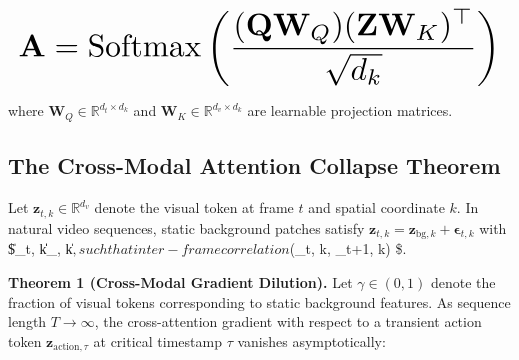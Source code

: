 \documentclass{article}
\begin{document}
\begin{equation}
\resizebox{\columnwidth}{!}{$\displaystyle
\begin{aligned}
\mathbf{A} = \text{Softmax}\left( \frac{(\mathbf{Q} \mathbf{W}_Q) (\mathbf{Z} \mathbf{W}_K)^\top}{\sqrt{d_k}} \right)
\end{aligned}
$}
\end{equation}

























where $\mathbf{W}_Q \in \mathbb{R}^{d_t \times d_k}$ and $\mathbf{W}_K \in \mathbb{R}^{d_v \times d_k}$ are learnable projection matrices.




\subsection{The Cross-Modal Attention Collapse Theorem}


Let $\mathbf{z}_{t, k} \in \mathbb{R}^{d_v}$ denote the visual token at frame $t$ and spatial coordinate $k$. In natural video sequences, static background patches satisfy $\mathbf{z}_{t, k} = \mathbf{z}_{\text{bg}, k} + \boldsymbol{\epsilon}_{t, k}$ with \$\|\boldsymbol{\epsilon}\_{t, k}\| \ll \|\_{, k}\|$, such that inter-frame correlation $\rho(\_{t, k}, \_{t+1, k}) \$.

\textbf{Theorem 1 (Cross-Modal Gradient Dilution).} Let $\gamma \in (0, 1)$ denote the fraction of visual tokens corresponding to static background features. As sequence length $T \to \infty$, the cross-attention gradient with respect to a transient action token $\mathbf{z}_{\text{action}, \tau}$ at critical timestamp $\tau$ vanishes asymptotically:
\end{document}
